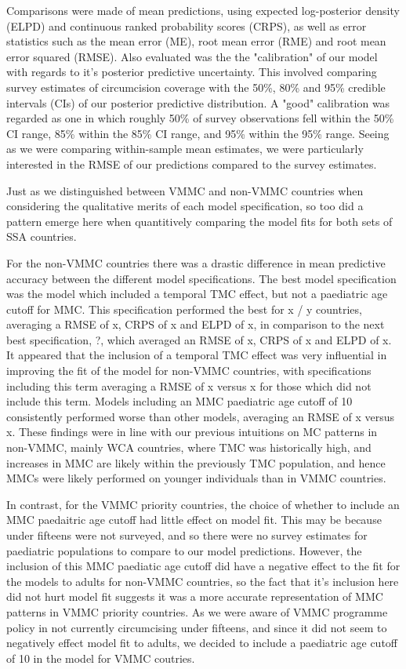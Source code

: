 \documentclass[a4paper, 12pt]{article}
\begin{document}
Comparisons were made of mean predictions, using expected log-posterior density (ELPD) and continuous ranked probability scores (CRPS), as well as error statistics such as the mean error (ME), root mean error (RME) and root mean error squared (RMSE).
Also evaluated was the the "calibration" of our model with regards to it's posterior predictive uncertainty.
This involved comparing survey estimates of circumcision coverage with the 50\%, 80\% and 95\% credible intervals (CIs) of our posterior predictive distribution. A "good" calibration was regarded as one in which roughly 50\% of survey observations fell within the 50\% CI range, 85\% within the 85\% CI range, and 95\% within the 95\% range.
Seeing as we were comparing within-sample mean estimates, we were particularly interested in the RMSE of our predictions compared to the survey estimates. 

Just as we distinguished between VMMC and non-VMMC countries when considering the qualitative merits of each model specification, so too did a pattern emerge here when quantitively comparing the model fits for both sets of SSA countries. 

For the non-VMMC countries there was a drastic difference in mean predictive accuracy between the different model specifications.
The best model specification was the model which included a temporal TMC effect, but not a paediatric age cutoff for MMC.
This specification performed the best for x / y countries, averaging a RMSE of x, CRPS of x and ELPD of x, in comparison to the next best specification, ?, which averaged an RMSE of x, CRPS of x and ELPD of x. 
It appeared that the inclusion of a temporal TMC effect was very influential in improving the fit of the model for non-VMMC countries, with specifications including this term averaging a RMSE of x versus x for those which did not include this term.
Models including an MMC paediatric age cutoff of 10 consistently performed worse than other models, averaging an RMSE of x versus x. 
These findings were in line with our previous intuitions on MC patterns in non-VMMC, mainly WCA countries, where TMC was historically high, and increases in MMC are likely within the previously TMC population, and hence MMCs were likely performed on younger individuals than in VMMC countries. 

In contrast, for the VMMC priority countries, the choice of whether to include an MMC paedaitric age cutoff had little effect on model fit.
This may be because under fifteens were not surveyed, and so there were no survey estimates for paediatric populations to compare to our model predictions.
However, the inclusion of this MMC paediatic age cutoff did have a negative effect to the fit for the models to adults for non-VMMC countries, so the fact that it's inclusion here did not hurt model fit suggests it was a more accurate representation of MMC patterns in VMMC priority countries.
As we were aware of VMMC programme policy in not currently circumcising under fifteens, and since it did not seem to negatively effect model fit to adults, we decided to include a paediatric age cutoff of 10 in the model for VMMC coutries. 
\end{document}
